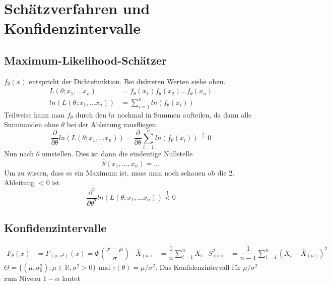 \documentclass[
ngerman,
accentcolor=9c,%
type=intern,
marginpar=false
]{tudapub}
\begin{document}
    \section{Schätzverfahren und Konfidenzintervalle}
        \subsection{Maximum-Likelihood-Schätzer}
            $f_\theta(x)$ entspricht der Dichtefunktion. Bei diskreten Werten siehe oben.
            \begin{align*}
                L(\theta; x_1, \dots x_n) &= f_\theta(x_1)f_\theta(x_2)\dots f_\theta(x_n)\\
                ln\left( L(\theta; x_1, \dots x_n) \right) &= \sum_{i=1}^{n}ln\left( f_\theta(x_i) \right)
            \end{align*}
            Teilweise kann man $f_\theta$ durch den $ln$ nochmal in Summen aufteilen, da dann alle Summanden ohne $\theta$ bei der Ableitung rausfliegen.
            \begin{equation*}
                \frac{\partial}{\partial \theta} ln\left( L(\theta; x_1, \dots x_n) \right) =
                \frac{\partial}{\partial \theta} \sum_{i=1}^{n}ln\left( f_\theta(x_i) \right) \overset{!}{=} 0
            \end{equation*}
            Nun nach $\theta$ umstellen. Dies ist dann die eindeutige Nullstelle
            \begin{equation*}
                \hat{\theta}(x_1, \dots, x_n) = \dots
            \end{equation*}
            Um zu wissen, dass es ein Maximum ist, muss man noch schauen ob die 2. Ableitung $<0$ ist
            \begin{equation*}
                \frac{\partial^2}{\partial \theta^2} ln\left( L(\theta; x_1, \dots x_n) \right) \overset{!}{<} 0
            \end{equation*}
        \subsection{Konfidenzintervalle}
            \begin{align*}
                F_\theta(x) &= F_{(\mu, \sigma^2)}(x)= \Phi(\dfrac{x-\mu}{\sigma}) &
                \bar{X}_{(n)}&=\dfrac{1}{n}\sum_{i=1}^n X_i &
                S^2_{(n)} &= \dfrac{1}{n-1}\sum_{i=1}^n (X_i - \bar{X}_{(n)})^2
            \end{align*}
            $\Theta = \{(\mu, \sigma^2_0):\mu \in \mathbb{R},\sigma^2 > 0\}$ und $\tau(\theta) = \mu/\sigma^2$.
            Das Konfidenzintervall für $\mu/\sigma^2$ zum Niveau $1-\alpha$ lautet
\end{document}
